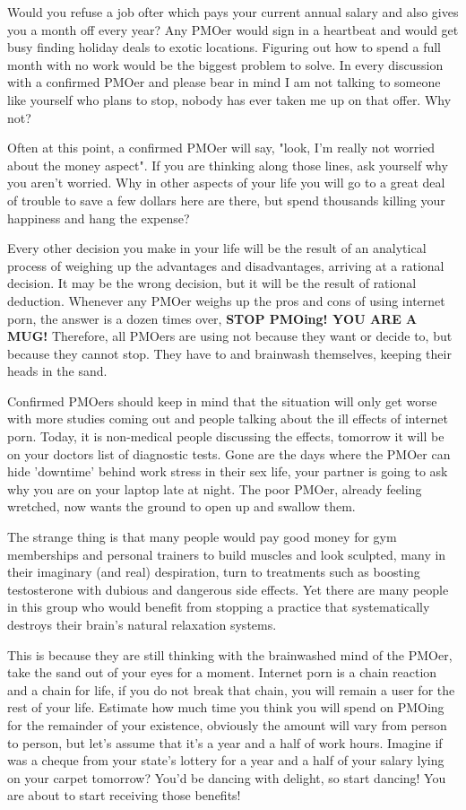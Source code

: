 \documentclass[easypeasy.tex]{subfiles}
\begin{document}
Would you refuse a job ofter which pays your current annual salary and also gives you a month off every year? Any PMOer would sign in a heartbeat and would get busy finding holiday deals to exotic locations. Figuring out how to spend a full month with no work would be the biggest problem to solve. In every discussion with a confirmed PMOer and please bear in mind I am not talking to someone like yourself who plans to stop, nobody has ever taken me up on that offer. Why not?

Often at this point, a confirmed PMOer will say, "look, I'm really not worried about the money aspect". If you are thinking along those lines, ask yourself why you aren't worried. Why in other aspects of your life you will go to a great deal of trouble to save a few dollars here are there, but spend thousands killing your happiness and hang the expense?

Every other decision you make in your life will be the result of an analytical process of weighing up the advantages and disadvantages, arriving at a rational decision. It may be the wrong decision, but it will be the result of rational deduction. Whenever any PMOer weighs up the pros and cons of using internet porn, the answer is a dozen times over, \textbf{STOP PMOing! YOU ARE A MUG!} Therefore, all PMOers are using not because they want or decide to, but because they cannot stop. They have to and brainwash themselves, keeping their heads in the sand.

Confirmed PMOers should keep in mind that the situation will only get worse with more studies coming out and people talking about the ill effects of internet porn. Today, it is non-medical people discussing the effects, tomorrow it will be on your doctors list of diagnostic tests. Gone are the days where the PMOer can hide 'downtime' behind work stress in their sex life, your partner is going to ask why you are on your laptop late at night. The poor PMOer, already feeling wretched, now wants the ground to open up and swallow them.

The strange thing is that many people would pay good money for gym memberships and personal trainers to build muscles and look sculpted, many in their imaginary (and real) despiration, turn to treatments such as boosting testosterone with dubious and dangerous side effects. Yet there are many people in this group who would benefit from stopping a practice that systematically destroys their brain's natural relaxation systems.

This is because they are still thinking with the brainwashed mind of the PMOer, take the sand out of your eyes for a moment. Internet porn is a chain reaction and a chain for life, if you do not break that chain, you will remain a user for the rest of your life. Estimate how much time you think you will spend on PMOing for the remainder of your existence, obviously the amount will vary from person to person, but let's assume that it's a year and a half of work hours. Imagine if was a cheque from your state's lottery for a year and a half of your salary lying on your carpet tomorrow? You'd be dancing with delight, so start dancing! You are about to start receiving those benefits!
\end{document}
